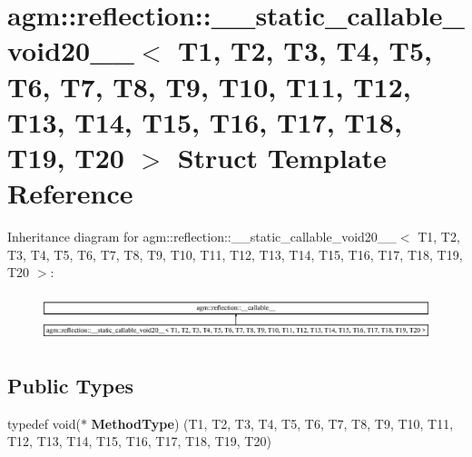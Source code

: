 \hypertarget{structagm_1_1reflection_1_1____static__callable__void20____}{}\section{agm\+:\+:reflection\+:\+:\+\_\+\+\_\+static\+\_\+callable\+\_\+void20\+\_\+\+\_\+$<$ T1, T2, T3, T4, T5, T6, T7, T8, T9, T10, T11, T12, T13, T14, T15, T16, T17, T18, T19, T20 $>$ Struct Template Reference}
\label{structagm_1_1reflection_1_1____static__callable__void20____}
Inheritance diagram for agm\+:\+:reflection\+:\+:\+\_\+\+\_\+static\+\_\+callable\+\_\+void20\+\_\+\+\_\+$<$ T1, T2, T3, T4, T5, T6, T7, T8, T9, T10, T11, T12, T13, T14, T15, T16, T17, T18, T19, T20 $>$\+:\begin{figure}[H]
\begin{center}
\leavevmode
\includegraphics[height=1.377614cm]{structagm_1_1reflection_1_1____static__callable__void20____}
\end{center}
\end{figure}
\subsection*{Public Types}
\begin{DoxyCompactItemize}
\item 
typedef void($\ast$ {\bfseries Method\+Type}) (T1, T2, T3, T4, T5, T6, T7, T8, T9, T10, T11, T12, T13, T14, T15, T16, T17, T18, T19, T20)\hypertarget{structagm_1_1reflection_1_1____static__callable__void20_____a9457bda690aae16a93b2ea0f6a5c2a5d}{}\label{structagm_1_1reflection_1_1____static__callable__void20_____a9457bda690aae16a93b2ea0f6a5c2a5d}

\end{DoxyCompactItemize}
